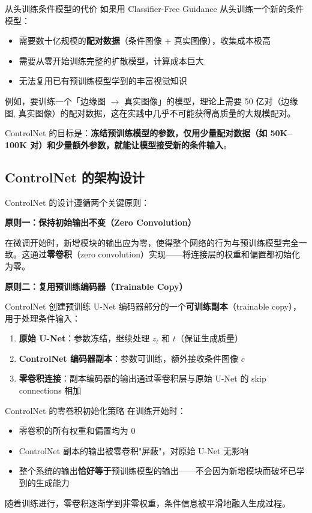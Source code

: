 \documentclass[a4paper]{article}
\begin{document}
\begin{warningbox}{从头训练条件模型的代价}
如果用 Classifier-Free Guidance 从头训练一个新的条件模型：
\begin{itemize}
    \item 需要数十亿规模的\textbf{配对数据}（条件图像 + 真实图像），收集成本极高
    \item 需要从零开始训练完整的扩散模型，计算成本巨大
    \item 无法复用已有预训练模型学到的丰富视觉知识
\end{itemize}
例如，要训练一个「边缘图 $\to$ 真实图像」的模型，理论上需要 50 亿对（边缘图, 真实图像）的配对数据，这在实践中几乎不可能获得高质量的大规模配对。
\end{warningbox}

ControlNet 的目标是：\textbf{冻结预训练模型的参数，仅用少量配对数据（如 50K--100K 对）和少量额外参数，就能让模型接受新的条件输入}。

\subsection{ControlNet 的架构设计}

ControlNet 的设计遵循两个关键原则：

\textbf{原则一：保持初始输出不变（Zero Convolution）}

在微调开始时，新增模块的输出应为零，使得整个网络的行为与预训练模型完全一致。这通过\textbf{零卷积}（zero convolution）实现——将连接层的权重和偏置都初始化为零。

\textbf{原则二：复用预训练编码器（Trainable Copy）}

ControlNet 创建预训练 U-Net 编码器部分的一个\textbf{可训练副本}（trainable copy），用于处理条件输入：

\begin{enumerate}
    \item \textbf{原始 U-Net}：参数冻结，继续处理 $z_t$ 和 $t$（保证生成质量）
    \item \textbf{ControlNet 编码器副本}：参数可训练，额外接收条件图像 $c$
    \item \textbf{零卷积连接}：副本编码器的输出通过零卷积层与原始 U-Net 的 skip connections 相加
\end{enumerate}

\begin{importantbox}{ControlNet 的零卷积初始化策略}
在训练开始时：
\begin{itemize}
    \item 零卷积的所有权重和偏置均为 0
    \item ControlNet 副本的输出被零卷积"屏蔽"，对原始 U-Net 无影响
    \item 整个系统的输出\textbf{恰好等于}预训练模型的输出——不会因为新增模块而破坏已学到的生成能力
\end{itemize}
随着训练进行，零卷积逐渐学到非零权重，条件信息被平滑地融入生成过程。
\end{importantbox}
\end{document}
